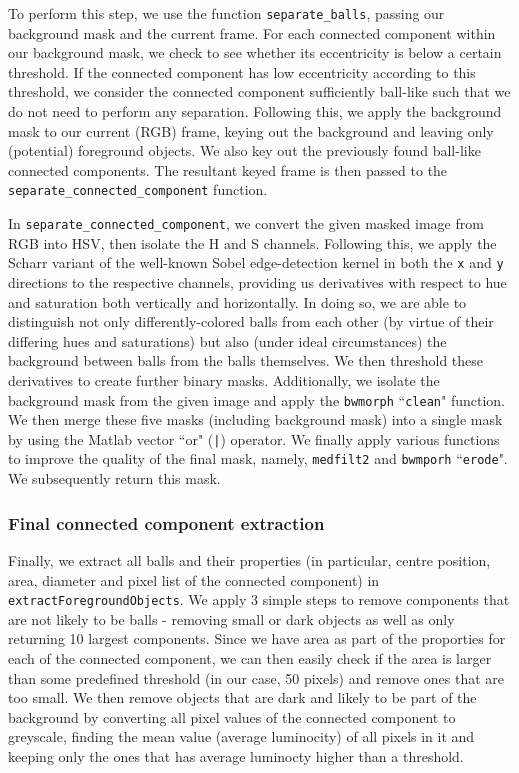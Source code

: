 \documentclass[12pt,a4paper]{article}
\begin{document}
To perform this step, we use the function \texttt{separate\_balls}, passing our background mask and the current frame. For each connected component within our background mask, we check to see whether its eccentricity is below a certain threshold. If the connected component has low eccentricity according to this threshold, we consider the connected component sufficiently ball-like such that we do not need to perform any separation. Following this, we apply the background mask to our current (RGB) frame, keying out the background and leaving only (potential) foreground objects. We also key out the previously found ball-like connected components. The resultant keyed frame is then passed to the \texttt{separate\_connected\_component} function.

In \texttt{separate\_connected\_component}, we convert the given masked image from RGB into HSV, then isolate the H and S channels. Following this, we apply the Scharr variant of the well-known Sobel edge-detection kernel in both the \texttt{x} and \texttt{y} directions to the respective channels, providing us derivatives with respect to hue and saturation both vertically and horizontally. In doing so, we are able to distinguish not only differently-colored balls from each other (by virtue of their differing hues and saturations) but also (under ideal circumstances) the background between balls from the balls themselves. We then threshold these derivatives to create further binary masks. Additionally, we isolate the background mask from the given image and apply the \texttt{bwmorph} ``\texttt{clean}" function. We then merge these five masks (including background mask) into a single mask by using the Matlab vector ``or" (\texttt{|}) operator. We finally apply various functions to improve the quality of the final mask, namely, \texttt{medfilt2} and \texttt{bwmporh} ``\texttt{erode}". We subsequently return this mask.
\subsubsection{Final connected component extraction}
Finally, we extract all balls and their properties (in particular, centre position, area, diameter and pixel list of the connected component) in \texttt{extractForegroundObjects}. We apply 3 simple steps to remove components that are not likely to be balls - removing small or dark objects as well as only returning 10 largest components. Since we have area as part of the proporties for each of the connected component, we can then easily check if the area is larger than some predefined threshold (in our case, 50 pixels) and remove ones that are too small. We then remove objects that are dark and likely to be part of the background by converting all pixel values of the connected component to greyscale, finding the mean value (average luminocity) of all pixels in it and keeping only the ones that has average luminocty higher than a threshold.
\end{document}
